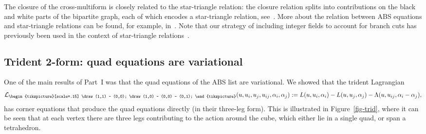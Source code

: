 \documentclass[10pt,a4paper]{amsart}
\newcommand{\trileg}{{\begin{tikzpicture}[scale=.15]
			\draw (1,1) -- (0,0);
			\draw (1,0) -- (0,0) -- (0,1);
\end{tikzpicture}}}
\newcommand{\cL}{\mathcal{L}}
\numberwithin{equation}{section}
\begin{document}
The closure of the cross-multiform is closely related to the star-triangle relation: the closure relation splits into contributions on the black and white parts of the bipartite graph, each of which encodes a star-triangle relation, see~\cite[Theorem~2]{bobenko2010lagrangian}.
More about the relation between ABS equations and star-triangle relations can be found, for example, in~\cite{bazhanov2016quasiclassical}. Note that our strategy of including integer fields to account for branch cuts has previously been used in the context of star-triangle relations~\cite{kels2021interaction, kels2023Twocomponent}.

\subsection{Trident 2-form: quad equations are variational}

One of the main results of Part~I was that the quad equations of the ABS list are variational. We showed that the trident Lagrangian
\[
 \cL_\trileg(u,u_i,u_j,u_{ij},\alpha_i,\alpha_j) := L(u,u_i,\alpha_i) - L(u,u_j,\alpha_j) - \Lambda(u,u_{ij}, \alpha_i-\alpha_j) ,
\]
has corner equations that produce the quad equations directly (in their three-leg form).
This is illustrated in Figure~\ref{fig-trid}, where it can be seen that at each vertex there are three legs contributing to the action around the cube, which either lie in a single quad, or span a tetrahedron.
\end{document}
